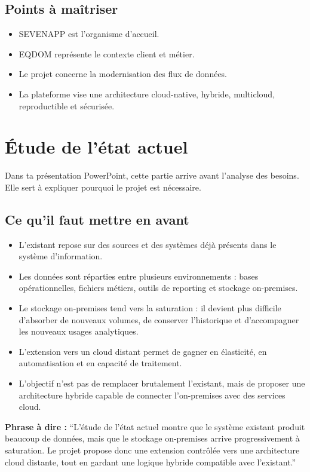 \documentclass[11pt,a4paper]{article}
\newcommand{\important}[1]{%
  \vspace{0.25cm}
  \noindent
  \colorbox{softblue}{%
    \parbox{\dimexpr\textwidth-2\fboxsep\relax}{#1}%
  }
  \vspace{0.2cm}
}
\begin{document}
\subsection{Points à maîtriser}

\begin{itemize}
  \item SEVENAPP est l'organisme d'accueil.
  \item EQDOM représente le contexte client et métier.
  \item Le projet concerne la modernisation des flux de données.
  \item La plateforme vise une architecture cloud-native, hybride, multicloud, reproductible et sécurisée.
\end{itemize}

\section{Étude de l'état actuel}

Dans ta présentation PowerPoint, cette partie arrive avant l'analyse des besoins. Elle sert à expliquer pourquoi le projet est nécessaire.

\subsection{Ce qu'il faut mettre en avant}

\begin{itemize}
  \item L'existant repose sur des sources et des systèmes déjà présents dans le système d'information.
  \item Les données sont réparties entre plusieurs environnements : bases opérationnelles, fichiers métiers, outils de reporting et stockage on-premises.
  \item Le stockage on-premises tend vers la saturation : il devient plus difficile d'absorber de nouveaux volumes, de conserver l'historique et d'accompagner les nouveaux usages analytiques.
  \item L'extension vers un cloud distant permet de gagner en élasticité, en automatisation et en capacité de traitement.
  \item L'objectif n'est pas de remplacer brutalement l'existant, mais de proposer une architecture hybride capable de connecter l'on-premises avec des services cloud.
\end{itemize}

\important{
\textbf{Phrase à dire :}
``L'étude de l'état actuel montre que le système existant produit beaucoup de données, mais que le stockage on-premises arrive progressivement à saturation. Le projet propose donc une extension contrôlée vers une architecture cloud distante, tout en gardant une logique hybride compatible avec l'existant.''
}
\end{document}
